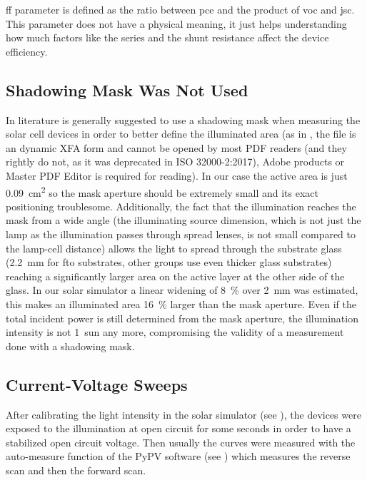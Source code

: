 \Gls{ff} parameter is defined as the ratio between \gls{pce} and the product of \gls{voc} and \gls{jsc}. This parameter does not have a physical meaning, it just helps understanding how much factors like the series and the shunt resistance affect the device efficiency.

	\subsection{Shadowing Mask Was Not Used}
	
		In literature is generally suggested to use a shadowing mask when measuring the solar cell devices in order to better define the illuminated area (as in \cite{NatureResearch2017}, the file is an dynamic XFA form and cannot be opened by most PDF readers (and they rightly do not, as it was deprecated in ISO 32000-2:2017), Adobe products or Master PDF Editor is required for reading). In our case the active area is just \SI{0.09}{\square\cm} so the mask aperture should be extremely small and its exact positioning troublesome. Additionally, the fact that the illumination reaches the mask from a wide angle (the illuminating source dimension, which is not just the lamp as the illumination passes through spread lenses, is not small compared to the lamp-cell distance) allows the light to spread through the substrate glass (\SI{2.2}{\mm} for \gls{fto} substrates, other groups use even thicker glass substrates) reaching a significantly larger area on the active layer at the other side of the glass. In our solar simulator a linear widening of 8~\% over \SI{2}{\mm} was estimated, this makes an illuminated area 16~\% larger than the mask aperture. Even if the total incident power is still determined from the mask aperture, the illumination intensity is not 1~sun any more, compromising the validity of a measurement done with a shadowing mask.

	\subsection{Current-Voltage Sweeps}

		After calibrating the light intensity in the solar simulator (see ), the devices were exposed to the illumination at open circuit for some seconds in order to have a stabilized open circuit voltage. Then usually the curves were measured with the auto-measure function of the PyPV software (see ) which measures the reverse scan and then the forward scan.
		
